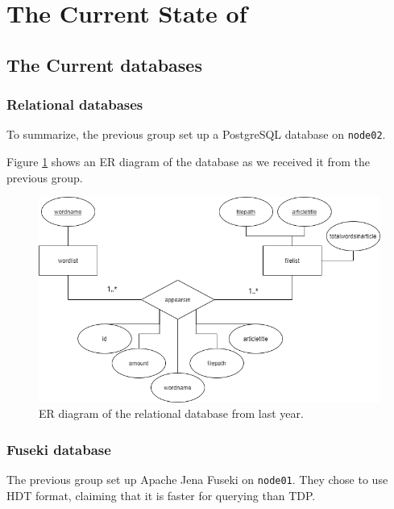 \section{The Current State of \knox{}} \label{currentState}





\subsection{The Current \knox{} databases}
\subsubsection*{Relational databases}
To summarize, the previous group set up a PostgreSQL database on \texttt{node02}.

Figure \ref{olddatabase} shows an ER diagram of the database as we received it from the previous group.

\begin{figure}[h]
    \centering
    \includegraphics[width=\linewidth]{Images/old_db_er_diagram.png}
    \caption{ER diagram of the relational database from last year.}
    \label{olddatabase}
\end{figure}

\subsubsection*{Fuseki database}
The previous group set up Apache Jena Fuseki on \texttt{node01}. They chose to use HDT format, claiming that it is faster for querying than TDP\cite{knox2020}.

